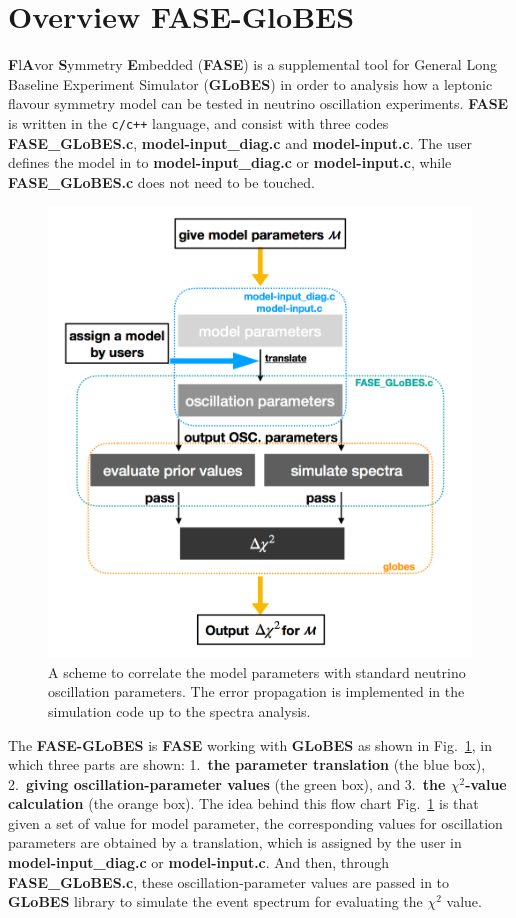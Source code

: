 \documentclass[a4paper,11pt]{article}
\begin{document}
\section{Overview FASE-GloBES}

\textbf{F}l\textbf{A}vor \textbf{S}ymmetry \textbf{E}mbedded (\textbf{FASE}) is a supplemental tool for General Long Baseline Experiment Simulator (\textbf{GLoBES}) in order to analysis how a leptonic flavour symmetry model can be tested in neutrino oscillation experiments. \textbf{FASE} is written in the \texttt{c/c++} language, and consist with three codes \textbf{FASE\_GLoBES.c}, \textbf{model-input\_diag.c} and \textbf{model-input.c}. The user defines the model in to \textbf{model-input\_diag.c} or \textbf{model-input.c}, while \textbf{FASE\_GLoBES.c} does not need to be touched. 

\begin{figure}[!h]%
\centering
\includegraphics[width=4.5in]{Figs/FASE-chart_1_v1.pdf}
\caption{A scheme to correlate the model parameters with standard neutrino oscillation parameters. The error propagation is implemented in the simulation code up to the spectra analysis.}%
\label{fig:FASE}
\end{figure}


The \textbf{FASE-GLoBES} is \textbf{FASE} working with \textbf{GLoBES} as shown in Fig.~\ref{fig:FASE}, in which three parts are shown: 1.~\textbf{the parameter translation} (the blue box), 2.~\textbf{giving oscillation-parameter values} (the green box), and 3.~\textbf{the $\chi^2$-value calculation} (the orange box). 
The idea behind this flow chart Fig.~\ref{fig:FASE} is that given a set of value for model parameter, the corresponding values for oscillation parameters are obtained by a translation, which is assigned by the user in \textbf{model-input\_diag.c} or \textbf{model-input.c}. And then, through \textbf{FASE\_GLoBES.c}, these oscillation-parameter values are passed in to \textbf{GLoBES} library to simulate the event spectrum for evaluating the $\chi^2$ value. 
\end{document}
